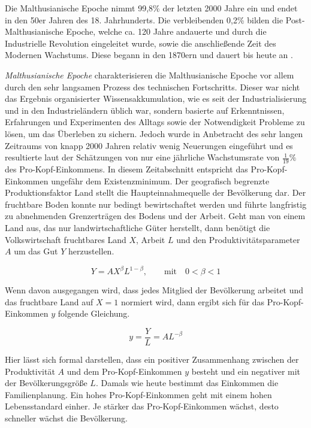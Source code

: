 Die Malthusianische Epoche nimmt 99,8{\%} der letzten 2000 Jahre ein und endet in den 50er Jahren des 18. Jahrhunderts. Die verbleibenden 0,2{\%} bilden die Post-Malthusianische Epoche, welche ca. 120 Jahre andauerte und durch die Industrielle Revolution eingeleitet wurde, sowie die anschlie{\ss}ende Zeit des Modernen Wachstums. Diese begann in den 1870ern und dauert bis heute an \cite{Galor.2014}.\newline


\textit{Malthusianische Epoche}\newline
\citet{Ashraf.2011} charakterisieren die Malthusianische Epoche vor allem durch den sehr langsamen Prozess des technischen Fortschritts. Dieser war nicht das Ergebnis organisierter Wissensakkumulation, wie es seit der Industrialisierung und in den Industrie\-l{\"a}ndern {\"u}blich war, sondern basierte auf Erkenntnissen, Erfahrungen und Experimenten des Alltags sowie der Notwendigkeit Probleme zu l{\"o}sen, um das {\"U}berleben zu sichern. Jedoch wurde in Anbetracht des sehr langen Zeitraums von knapp 2000 Jahren relativ wenig Neuerungen eingef{\"u}hrt und es resultierte laut der Sch{\"a}tzungen von \citet{Maddison.2001} nur eine j{\"a}hrliche Wachstumsrate von $\frac{1}{19}\%$ des Pro-Kopf-Einkommens. In diesem Zeitabschnitt entspricht das Pro-Kopf-Einkommen ungef{\"a}hr dem Existenzminimum. Der geografisch begrenzte Produktionsfaktor Land stellt die Haupteinnahmequelle der Bev{\"o}lkerung dar. Der fruchtbare Boden konnte nur bedingt bewirtschaftet werden und f{\"u}hrte langfristig zu abnehmenden Grenzertr{\"a}gen des Bodens und der Arbeit. Geht man von einem Land aus, das nur landwirtschaftliche G{\"u}ter herstellt, dann ben{\"o}tigt die Volkswirtschaft fruchtbares Land $X$, Arbeit $L$ und den Produktivit{\"a}tsparameter $A$ um das Gut $Y$ herzustellen.

	\begin{equation}
		Y=AX^\beta L^{1-\beta},  \qquad \text{mit}\quad 0< \beta < 1
	\end{equation}
	
Wenn davon ausgegangen wird, dass jedes Mitglied der Bev{\"o}lkerung arbeitet und das fruchtbare Land  auf $X=1$ normiert wird, dann ergibt sich f{\"u}r das Pro-Kopf-Einkommen $y$ folgende Gleichung. 

	\begin{equation}
		y=\frac{Y}{L}=AL^{-\beta}
	\end{equation}
	
Hier l{\"a}sst sich formal darstellen, dass ein positiver Zusammenhang zwischen der Produktivit{\"a}t $A$ und dem Pro-Kopf-Einkommen $y$ besteht und ein negativer mit der Bev{\"o}lkerungsgr{\"o}{\ss}e $L$. Damals wie heute bestimmt das Einkommen die Familienplanung. Ein hohes Pro-Kopf-Einkommen geht mit einem hohen Lebensstandard einher. Je st{\"a}rker das Pro-Kopf-Einkommen w{\"a}chst, desto schneller w{\"a}chst die Bev{\"o}lkerung.\\


